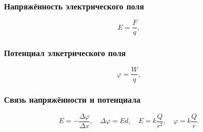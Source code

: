 \documentclass[12pt, a4paper]{article}
\begin{document}
\subsubsection*{Напряжённость электрического поля}

\[
E = \frac{F}{q},
\]

\subsubsection*{Потенциал элкетрического поля}

\[
\varphi = \frac{W}{q},
\]

\subsubsection*{Связь напряжённости и потенциала}

\[
E = -\frac{\Delta \varphi}{\Delta x},
\quad
\Delta\varphi = Ed,
\quad
E = k \frac{Q}{r^2},
\quad
\varphi = k \frac{Q}{r}.
\]
\end{document}
